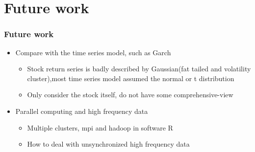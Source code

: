 \documentclass{beamer}
\begin{document}
\section{Future work}
\begin{frame}
\frametitle{Future work}
    \begin{itemize}
        \item  Compare with the time series model, such as Garch
        \begin{itemize}
        \item Stock return series is badly described by Gaussian(fat tailed and volatility cluster),most time series model assumed the normal or t distribution
        \item Only consider the stock itself, do not have some comprehensive-view
        \end{itemize}
        \item Parallel computing and high frequency data
        \begin{itemize}
        \item Multiple clusters, mpi and hadoop in software R
        \item How to deal with unsynchronized high frequency data
        \end{itemize}
      \end{itemize}


\end{frame}

\end{document}
